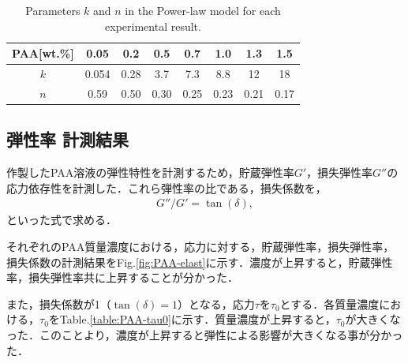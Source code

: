 \begin{table}[h]
	\centering
	\caption{Parameters $k$ and $n$ in the Power-law model for each experimental result.}
	\label{table:power-law}
	\begin{tabular}{c|c|c|c|c|c|c|c} \hline
		PAA[wt.\%] & 0.05  & 0.2  & 0.5  & 0.7  & 1.0  & 1.3  & 1.5  \\ \hline \hline
		$k$        & 0.054 & 0.28 & 3.7  & 7.3  & 8.8  & 12   & 18   \\
		$n$        & 0.59  & 0.50 & 0.30 & 0.25 & 0.23 & 0.21 & 0.17 \\ \hline
	\end{tabular}
\end{table}

\newpage

\subsection{弾性率 計測結果}
\label{sec:elasticity}

作製したPAA溶液の弾性特性を計測するため，貯蔵弾性率$G'$，損失弾性率$G''$の応力依存性を計測した．これら弾性率の比である，損失係数を，
\begin{eqnarray}
	\label{eq:}
	G''/G'=\tan\left(\delta\right) ,
\end{eqnarray}
といった式で求める．

それぞれのPAA質量濃度における，応力に対する，貯蔵弾性率，損失弾性率，損失係数の計測結果をFig.\ref{fig:PAA-elast}に示す．濃度が上昇すると，貯蔵弾性率，損失弾性率共に上昇することが分かった．

また，損失係数が1（$\tan(\delta)=1$）となる，応力$\tau$を$\tau_0$とする．各質量濃度における，$\tau_0$をTable.\ref{table:PAA-tau0}に示す．質量濃度が上昇すると，$\tau_0$が大きくなった．このことより，濃度が上昇すると弾性による影響が大きくなる事が分かった．


